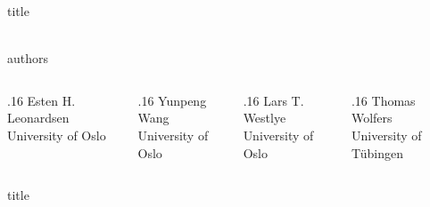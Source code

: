 \documentclass[final, pt]{beamer}
\begin{document}
\begin{frame}[t]
    \thispagestyle{empty}

    \begin{beamercolorbox}[sep=0em,wd=\textwidth]{title}
        \centering\\[4cm]
        \fontsize{48}{48}{\textbf{\inserttitle}}\\[3.25cm]

    \end{beamercolorbox}

    \begin{beamercolorbox}[sep=0em, wd=\textwidth]{authors}
        \def\authorwidth{.16\textwidth}
        \begin{columns}[T]
            \begin{column}{\authorwidth}
                \centering
                Esten H. Leonardsen\\
                University of Oslo\\
                \vspace{1em}
            \end{column}
            \begin{column}{\authorwidth}
                \centering
                Yunpeng Wang\\
                University of Oslo
            \end{column}
            \begin{column}{\authorwidth}
                \centering
                Lars T. Westlye\\
                University of Oslo
            \end{column}
            \begin{column}{\authorwidth}
                \centering
                Thomas Wolfers\\
                University of Tübingen
            \end{column}
        \end{columns}
    \end{beamercolorbox}

    \begin{columns}[t]
        \begin{column}{0.32\textwidth}
            \lipsum[1-4]
        \end{column}
        \begin{column}{0.66\textwidth}
        \end{column}
    \end{columns}

    \vfill
    \begin{beamercolorbox}[sep=0pt,wd=\textwidth]{title}
        \centering
    \end{beamercolorbox}


\end{frame}
\end{document}
